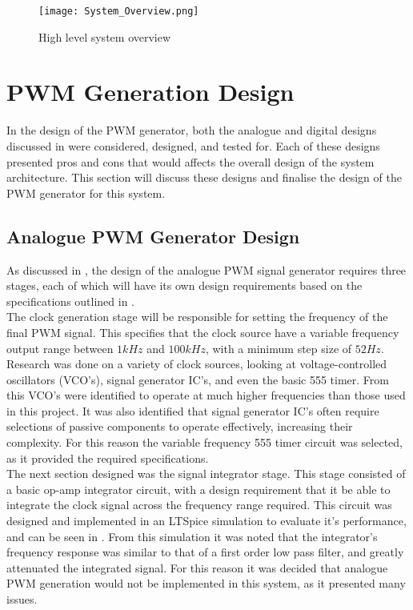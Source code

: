 \begin{figure}[!h]
    \texttt{[image: System\_Overview.png]}
    \caption{High level system overview}
    \vspace{-20pt}
    \label{F:sys_overview}
\end{figure}

\section{PWM Generation Design}\label{S:pwm_gen}

In the design of the PWM generator, both the analogue and digital designs discussed in  were considered, designed, and tested for. Each of these designs presented pros and cons that would affects the overall design of the system architecture. This section will discuss these designs and finalise the design of the PWM generator for this system. 

\subsection{Analogue PWM Generator Design}\label{S:analogue_design}

As discussed in , the design of the analogue PWM signal generator requires three stages, each of which will have its own design requirements based on the specifications outlined in . \\

The clock generation stage will be responsible for setting the frequency of the final PWM signal. This specifies that the clock source have a variable frequency output range between $1kHz$ and $100kHz$, with a minimum step size of $52Hz$. Research was done on a variety of clock sources, looking at voltage-controlled oscillators (VCO's), signal generator IC's, and even the basic 555 timer. From this VCO's were identified to operate at much higher frequencies than those used in this project. It was also identified that signal generator IC's often require selections of passive components to operate effectively, increasing their complexity. For this reason the variable frequency 555 timer circuit was selected, as it provided the required specifications.\\

The next section designed was the signal integrator stage. This stage consisted of a basic op-amp integrator circuit, with a design requirement that it be able to integrate the clock signal across the frequency range required. This circuit was designed and implemented in an LTSpice simulation to evaluate it's performance, and can be seen in . From this simulation it was noted that the integrator's frequency response was similar to that of a first order low pass filter, and greatly attenuated the integrated signal. For this reason it was decided that analogue PWM generation would not be implemented in this system, as it presented many issues.

